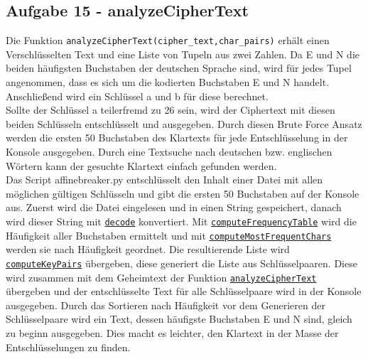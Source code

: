 \documentclass[12pt]{article}
\begin{document}
		\subsection{\label{ssec:Aufgabe15}Aufgabe 15 - analyzeCipherText}
			Die Funktion \texttt{analyzeCipherText(cipher\_text,char\_pairs)} erh\"alt einen Verschl\"usselten Text und eine Liste von Tupeln aus zwei Zahlen. 
Da E und N die beiden h\"aufigsten Buchstaben der deutschen Sprache sind, wird f\"ur jedes Tupel angenommen, dass es sich um die kodierten Buchstaben E und N handelt.
Anschlie{\ss}end wird ein Schl\"ussel a und b f\"ur diese berechnet.\\ Sollte der Schl\"ussel a teilerfremd zu 26 sein, wird der Ciphertext mit diesen beiden Schl\"usseln entschl\"usselt und ausgegeben.
Durch diesen Brute Force Ansatz werden die ersten 50 Buchstaben des Klartexts f\"ur jede Entschl\"usselung in der Konsole ausgegeben. Durch eine Textsuche nach deutschen bzw. englischen W\"ortern kann der gesuchte Klartext einfach gefunden werden.\\
			
		
		Das Script affinebreaker.py entschl\"usselt den Inhalt einer Datei mit allen m\"oglichen g\"ultigen Schl\"usseln und gibt die ersten 50 Buchstaben auf der Konsole aus. 
Zuerst wird die Datei eingelesen und in einen String gespeichert, danach wird dieser String mit \hyperref[ssec:Aufgabe1]{\texttt{decode}} konvertiert.
Mit \hyperref[ssec:Aufgabe11]{\texttt{computeFrequencyTable}} wird die H\"aufigkeit aller Buchstaben ermittelt und mit \hyperref[ssec:Aufgabe13]{\texttt{computeMostFrequentChars}} werden sie nach H\"aufigkeit geordnet.
Die resultierende Liste wird \hyperref[ssec:Aufgabe14]{\texttt{computeKeyPairs}} \"ubergeben, diese generiert die Liste aus Schl\"usselpaaren. Diese wird zusammen  mit dem Geheimtext der Funktion \hyperref[ssec:Aufgabe15]{\texttt{analyzeCipherText}} \"ubergeben 
und der entschl\"usselte Text f\"ur alle Schl\"usselpaare wird in der Konsole ausgegeben.
Durch das Sortieren nach H\"aufigkeit vor dem Generieren der Schl\"usselpaare wird ein Text, dessen h\"aufigste Buchstaben E und N sind, gleich zu beginn ausgegeben. Dies macht es leichter, den Klartext in der Masse der Entschl\"usselungen zu finden.
		
	
\end{document}
